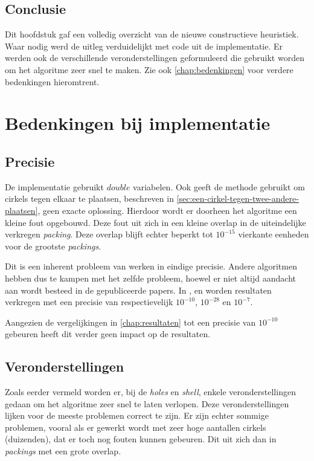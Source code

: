 \documentclass[12pt,a4paper,oneside]{book}
\begin{document}
\section{Conclusie}

Dit hoofdstuk gaf een volledig overzicht van de nieuwe constructieve heuristiek.
Waar nodig werd de uitleg verduidelijkt met code uit de implementatie.
Er werden ook de verschillende veronderstellingen geformuleerd die gebruikt worden om het algoritme zeer snel te maken.
Zie ook \autoref{chap:bedenkingen} voor verdere bedenkingen hieromtrent.


\chapter{Bedenkingen bij implementatie} \label{chap:bedenkingen}

\section{Precisie}

De implementatie gebruikt $double$ variabelen.
Ook geeft de methode gebruikt om cirkels tegen elkaar te plaatsen, beschreven in \autoref{sec:een-cirkel-tegen-twee-andere-plaatsen}, geen exacte oplossing.
Hierdoor wordt er doorheen het algoritme een kleine fout opgebouwd.
Deze fout uit zich in een kleine overlap in de uiteindelijke verkregen \textit{packing}.
Deze overlap blijft echter beperkt tot $10^{-15}$ vierkante eenheden voor de grootste \textit{packings}.

Dit is een inherent probleem van werken in eindige precisie.
Andere algoritmen hebben dus te kampen met het zelfde probleem, hoewel er niet altijd aandacht aan wordt besteed in de gepubliceerde papers.
In \cite{akeb2006basic}, \cite{ye2013iterated} en \cite{m2013packing} worden resultaten verkregen met een precisie van respectievelijk $10^{-10}$, $10^{-28}$ en $10^{-7}$.


Aangezien de vergelijkingen in \autoref{chap:resultaten} tot een precisie van $10^{-10}$ gebeuren heeft dit verder geen impact op de resultaten.

\section{Veronderstellingen}

Zoals eerder vermeld worden er, bij de \textit{holes} en \textit{shell}, enkele veronderstellingen gedaan om het algoritme zeer snel te laten verlopen.
Deze veronderstellingen lijken voor de meeste problemen correct te zijn.
Er zijn echter sommige problemen, vooral als er gewerkt wordt met zeer hoge aantallen cirkels (duizenden), dat er toch nog fouten kunnen gebeuren.
Dit uit zich dan in \textit{packings} met een grote overlap.
\end{document}
